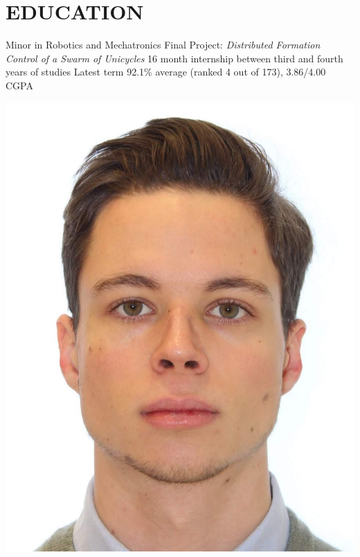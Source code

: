 \documentclass{ResumeTemplate}
\begin{document}
\begin{minipage}[c]{0.75\linewidth}
		\section{EDUCATION}
		
		\workitemsfour
		{Minor in Robotics and Mechatronics}
		{Final Project: \textit{Distributed Formation Control of a Swarm of Unicycles}}
		{16 month internship between third and fourth years of studies}
		{Latest term 92.1\% average (ranked 4 out of 173), 3.86/4.00 CGPA}

	\end{minipage}
	\noindent\begin{minipage}[c]{0.24\linewidth}
		\centering

		\includegraphics[width=0.8\linewidth]{me}


\end{minipage}
\end{document}
